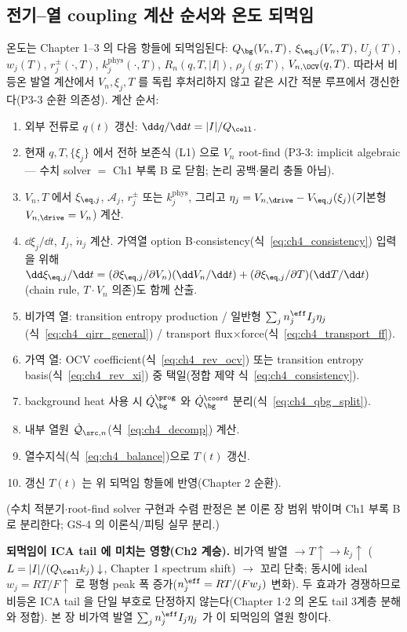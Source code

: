 \subsection{전기--열 coupling 계산 순서와 온도 되먹임}\label{sec:ch4_order}
온도는 Chapter 1--3 의 다음 항들에 되먹임된다: $Q_\bg(V_n,T)$, $\xi_{\eq,j}(V_n,T)$, $U_j(T)$, $w_j(T)$,
$r_j^\pm(\cdot,T)$, $k_j^{\mathrm{phys}}(\cdot,T)$, $R_n(q,T,|I|)$, $\rho_j(g;T)$, $V_{n,\OCV}(q,T)$. 따라서
비등온 발열 계산에서 $V_n,\xi_j,T$ 를 독립 후처리하지 않고 같은 시간 적분 루프에서 갱신한다(P3-3 순환 의존성).
계산 순서:
\begin{enumerate}[label=\arabic*),leftmargin=2.0em]
\item 외부 전류로 $q(t)$ 갱신: $\dd q/\dd t=|I|/Q_\cell$.
\item 현재 $q,T,\{\xi_j\}$ 에서 전하 보존식 (L1) 으로 $V_n$ root-find (P3-3: implicit algebraic — 수치 solver $=$
  Ch1 부록 B 로 닫힘; 논리 공백$\cdot$물리 충돌 아님).
\item $V_n,T$ 에서 $\xi_{\eq,j}$, $\mathcal A_j$, $r_j^\pm$ 또는 $k_j^{\mathrm{phys}}$, 그리고
  $\eta_j=V_{n,\drive}-V_{\eq,j}(\xi_j)$(기본형 $V_{n,\drive}=V_n$) 계산.
\item $\dd\xi_j/\dd t$, $I_j$, $\dot n_j$ 계산. 가역열 option B$\cdot$consistency(식~\eqref{eq:ch4_consistency})
  입력을 위해 $\dd\xi_{\eq,j}/\dd t=(\partial\xi_{\eq,j}/\partial V_n)(\dd V_n/\dd t)+(\partial\xi_{\eq,j}/\partial T)(\dd T/\dd t)$
  (chain rule, $T\cdot V_n$ 의존)도 함께 산출.
\item 비가역 열: transition entropy production / 일반형 $\sum_j n_j^{\eff}I_j\eta_j$(식~\eqref{eq:ch4_qirr_general})
  / transport flux$\times$force(식~\eqref{eq:ch4_transport_ff}).
\item 가역 열: OCV coefficient(식~\eqref{eq:ch4_rev_ocv}) 또는 transition entropy basis(식~\eqref{eq:ch4_rev_xi})
  중 택일(정합 제약 식~\eqref{eq:ch4_consistency}).
\item background heat 사용 시 $\dot Q_\bg^{\prog}$ 와 $\dot Q_\bg^{\coord}$ 분리(식~\eqref{eq:ch4_qbg_split}).
\item 내부 열원 $\dot{\mathcal Q}_{\src,n}$(식~\eqref{eq:ch4_decomp}) 계산.
\item 열수지식(식~\eqref{eq:ch4_balance})으로 $T(t)$ 갱신.
\item 갱신 $T(t)$ 는 위 되먹임 항들에 반영(Chapter 2 순환).
\end{enumerate}
(수치 적분기$\cdot$root-find solver 구현과 수렴 판정은 본 이론 장 범위 밖이며 Ch1 부록 B 로 분리한다; GS-4 의
이론식/피팅 실무 분리.)
\begin{boundbox}
\textbf{되먹임이 ICA tail 에 미치는 영향(Ch2 계승).} 비가역 발열 $\to T\uparrow\to k_j\uparrow$
($L=|I|/(Q_\cell k_j)\downarrow$, Chapter 1 spectrum shift) $\to$ 꼬리 단축; 동시에 ideal $w_j=RT/F\uparrow$ 로
평형 peak 폭 증가($n_j^{\eff}=RT/(Fw_j)$ 변화). 두 효과가 경쟁하므로 비등온 ICA tail 을 단일 부호로 단정하지
않는다(Chapter 1$\cdot$2 의 온도 tail 3계층 분해와 정합). 본 장 비가역 발열 $\sum_j n_j^{\eff}I_j\eta_j$ 가
이 되먹임의 열원 항이다.
\end{boundbox}

